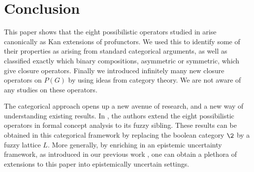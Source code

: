 

\section{Conclusion}

This paper shows that the eight possibilistic operators studied in \cite{dubois-dupin-prade_2007,dubois-prade_2009} arise canonically as Kan extensions of profunctors. We used this to identify some of their properties as arising from standard categorical arguments, as well as classified exactly which binary compositions, asymmetric or symmetric, which give closure operators. Finally we introduced infinitely many new closure operators on $P(G)$ by using ideas from category theory. We are not aware of any studies on these operators. 

The categorical approach opens up a new avenue of research, and a new way of understanding existing results. In \cite{djouadi_prade_2011}, the authors extend the eight possibilistic operators in formal concept analysis to its fuzzy sibling. These results can be obtained in this categorical framework by replacing the boolean category $\2$ by a fuzzy lattice $L$. More generally, by enriching in an epistemic uncertainty framework, as introduced in our previous work \cite{aambo_2026}, one can obtain a plethora of extensions to this paper into epistemically uncertain settings. 


